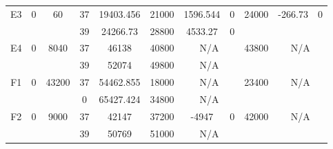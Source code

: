 \begin{sidewaystable}
\begin{tabular}{c||c|c||c|c|c|c|c||c|c|c}
         &
        
      \\
      \hline
      \multirow{2}{*}{E3} &
      \multirow{2}{*}{0} &
      \multirow{2}{*}{60} &
      37 &
      19403.456 &
      21000 &
        1596.544 &
        0 &
      \multirow{2}{*}{24000} &
        \multirow{2}{*}{-266.73} &
        \multirow{2}{*}{0}
      \\
      \cline{4-8}
       &
       &
       &
      39 &
      24266.73 &
      28800 &
        4533.27 &
        0 &
      
         &
        
      \\
      \hline
      \multirow{2}{*}{E4} &
      \multirow{2}{*}{0} &
      \multirow{2}{*}{8040} &
      37 &
      46138 &
      40800 &
        \multicolumn{2}{|c||}{N/A} &
      \multirow{2}{*}{43800} &
        \multicolumn{2}{c}{\multirow{2}{*}{N/A}}
      \\
      \cline{4-8}
       &
       &
       &
      39 &
      52074 &
      49800 &
        \multicolumn{2}{|c||}{N/A} &
      
        
      \\
      \hline
      \multirow{2}{*}{F1} &
      \multirow{2}{*}{0} &
      \multirow{2}{*}{43200} &
      37 &
      54462.855 &
      18000 &
        \multicolumn{2}{|c||}{N/A} &
      \multirow{2}{*}{23400} &
        \multicolumn{2}{c}{\multirow{2}{*}{N/A}}
      \\
      \cline{4-8}
       &
       &
       &
      0 &
      65427.424 &
      34800 &
        \multicolumn{2}{|c||}{N/A} &
      
        
      \\
      \hline
      \multirow{2}{*}{F2} &
      \multirow{2}{*}{0} &
      \multirow{2}{*}{9000} &
      37 &
      42147 &
      37200 &
        -4947 &
        0 &
      \multirow{2}{*}{42000} &
        \multicolumn{2}{c}{\multirow{2}{*}{N/A}}
      \\
      \cline{4-8}
       &
       &
       &
      39 &
      50769 &
      51000 &
        \multicolumn{2}{|c||}{N/A} &
      
        
      \\
\end{tabular}
\label{table:RDS3.txt-12561.tex} 
\end{sidewaystable}